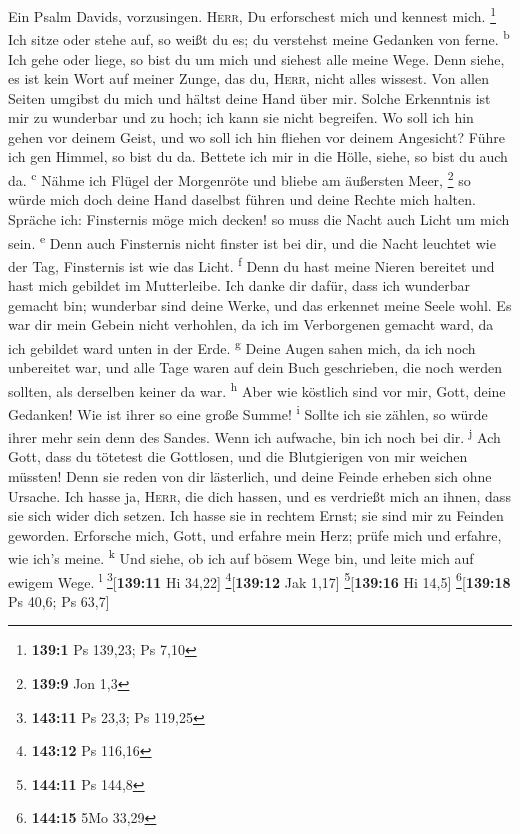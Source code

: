  Ein Psalm Davids, vorzusingen. \textsc{Herr}, Du
erforschest mich und kennest mich. \footnote{\textbf{139:1} Ps 139,23;
  Ps 7,10}  Ich sitze oder stehe auf, so weißt du es; du
verstehst meine Gedanken von ferne. \textsuperscript{b} 
Ich gehe oder liege, so bist du um mich und siehest alle meine Wege.
 Denn siehe, es ist kein Wort auf meiner Zunge, das du,
\textsc{Herr}, nicht alles wissest.  Von allen Seiten
umgibst du mich und hältst deine Hand über mir.  Solche
Erkenntnis ist mir zu wunderbar und zu hoch; ich kann sie nicht
begreifen.  Wo soll ich hin gehen vor deinem Geist, und wo
soll ich hin fliehen vor deinem Angesicht?  Führe ich gen
Himmel, so bist du da. Bettete ich mir in die Hölle, siehe, so bist du
auch da. \textsuperscript{c}  Nähme ich Flügel der
Morgenröte und bliebe am äußersten Meer, \footnote{\textbf{139:9} Jon
  1,3}  so würde mich doch deine Hand daselbst führen und
deine Rechte mich halten.  Spräche ich: Finsternis möge
mich decken! so muss die Nacht auch Licht um mich sein.
\textsuperscript{e}  Denn auch Finsternis nicht finster
ist bei dir, und die Nacht leuchtet wie der Tag, Finsternis ist wie das
Licht. \textsuperscript{f}  Denn du hast meine Nieren
bereitet und hast mich gebildet im Mutterleibe.  Ich
danke dir dafür, dass ich wunderbar gemacht bin; wunderbar sind deine
Werke, und das erkennet meine Seele wohl.  Es war dir
mein Gebein nicht verhohlen, da ich im Verborgenen gemacht ward, da ich
gebildet ward unten in der Erde. \textsuperscript{g} 
Deine Augen sahen mich, da ich noch unbereitet war, und alle Tage waren
auf dein Buch geschrieben, die noch werden sollten, als derselben keiner
da war. \textsuperscript{h}  Aber wie köstlich sind vor
mir, Gott, deine Gedanken! Wie ist ihrer so eine große Summe!
\textsuperscript{i}  Sollte ich sie zählen, so würde
ihrer mehr sein denn des Sandes. Wenn ich aufwache, bin ich noch bei
dir. \textsuperscript{j}  Ach Gott, dass du tötetest die
Gottlosen, und die Blutgierigen von mir weichen müssten! 
Denn sie reden von dir lästerlich, und deine Feinde erheben sich ohne
Ursache.  Ich hasse ja, \textsc{Herr}, die dich hassen,
und es verdrießt mich an ihnen, dass sie sich wider dich setzen.
 Ich hasse sie in rechtem Ernst; sie sind mir zu Feinden
geworden.  Erforsche mich, Gott, und erfahre mein Herz;
prüfe mich und erfahre, wie ich's meine. \textsuperscript{k}
 Und siehe, ob ich auf bösem Wege bin, und leite mich auf
ewigem Wege. \textsuperscript{l} \footnote{\textbf{143:11} Ps 23,3; Ps
  119,25}{[}\textbf{139:11} Hi 34,22{]} \footnote{\textbf{143:12} Ps
  116,16}{[}\textbf{139:12} Jak 1,17{]} \footnote{\textbf{144:11} Ps
  144,8}{[}\textbf{139:16} Hi 14,5{]} \footnote{\textbf{144:15} 5Mo
  33,29}{[}\textbf{139:18} Ps 40,6; Ps 63,7{]}

